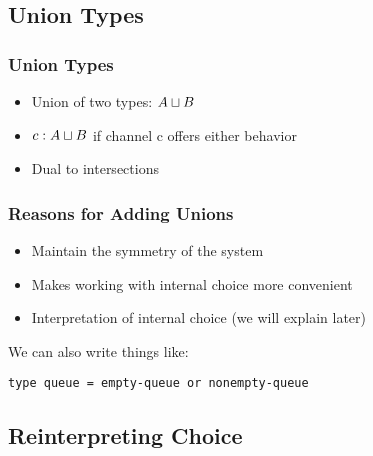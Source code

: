 \documentclass{beamer}
\begin{document}
\subsection{Union Types}

\begin{frame}
  \frametitle{Union Types}
  \begin{itemize}
    \item Union of two types: $A \mathbin{\sqcup} B$
    \item $c : A \mathbin{\sqcup} B$ if channel c offers either behavior
    \pause
    \item Dual to intersections
  \end{itemize}

  \pause
  \bigskip

\end{frame}


\begin{frame}[fragile]
  \frametitle{Reasons for Adding Unions}
  \begin{itemize}
    \item Maintain the symmetry of the system
    \item Makes working with internal choice more convenient
    \item Interpretation of internal choice (we will explain later)
  \end{itemize}

  \pause
  \bigskip
  We can also write things like:
  \bigskip

  \begin{lstlisting}
type queue = empty-queue or nonempty-queue
  \end{lstlisting}

\end{frame}

\subsection{Reinterpreting Choice}
\end{document}
